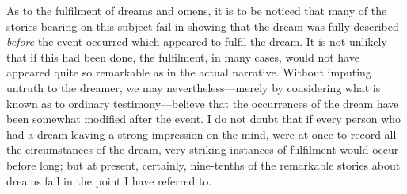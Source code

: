 \documentclass[letterpaper,12pt,oneside,openany]{memoir}
\begin{document}
As to the fulfilment of dreams and omens, it is to be
noticed that many of the stories bearing on this
subject fail in showing that the dream was fully
described \emph{before} the event occurred which appeared to
fulfil the dream. It is not unlikely that if this had
been done, the fulfilment, in many cases, would not
have appeared quite so remarkable as in the actual
narrative. Without imputing untruth to the dreamer,
we may nevertheless---merely by considering what is
known as to ordinary testimony---believe that the
occurrences of the dream have been somewhat modified
after the event. I do not doubt that if every person
who had a dream leaving a strong impression on the
mind, were at once to record all the circumstances of
the dream, very striking instances of fulfilment would
occur before long; but at present, certainly, nine-tenths
of the remarkable stories about dreams fail in
the point I have referred to.
\end{document}
